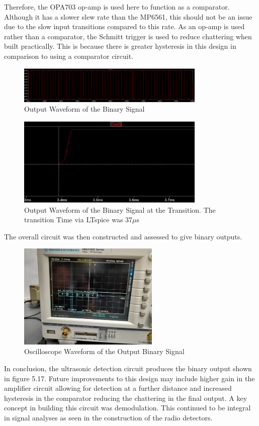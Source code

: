 Therefore, the OPA703 op-amp is used here to function as a comparator. Although it has a slower slew rate than the MP6561, this should not be an issue due to the slow input transitions compared to this rate. As an op-amp is used rather than a comparator, the Schmitt trigger is used to reduce chattering when built practically. This is because there is greater hysteresis in this design in comparison to using a comparator circuit.
\begin{figure}[h]
    \centering
    \includegraphics[width=0.8\textwidth]{subpages/images/ultra_binary_out.png}
    \caption{Output Waveform of the Binary Signal}
    \label{fig:binary_signal}
\end{figure}
\begin{figure}[h]
    \centering
    \includegraphics[width=0.8\textwidth]{subpages/images/ultra_binary_transition.png}
    \caption{Output Waveform of the Binary Signal at the Transition. The transition Time via LTspice was 37$\mu$s}
    \label{fig:binary_transition}
\end{figure}

The overall circuit was then constructed and assessed to give binary outputs.
\begin{figure}[H]
    \centering
    \includegraphics[width=0.6\textwidth]{subpages/images/ultra_out.png}
    \caption{Oscilloscope Waveform of the Output Binary Signal}
    \label{fig:binary_transition}
\end{figure}
In conclusion, the ultrasonic detection circuit produces the binary output shown in figure 5.17. Future improvements to this design may include higher gain in the amplifier circuit allowing for detection at a further distance and increased hysteresis in the comparator reducing the chattering in the final output. A key concept in building this circuit was demodulation. This continued to be integral in signal analyses as seen in the construction of the radio detectors.